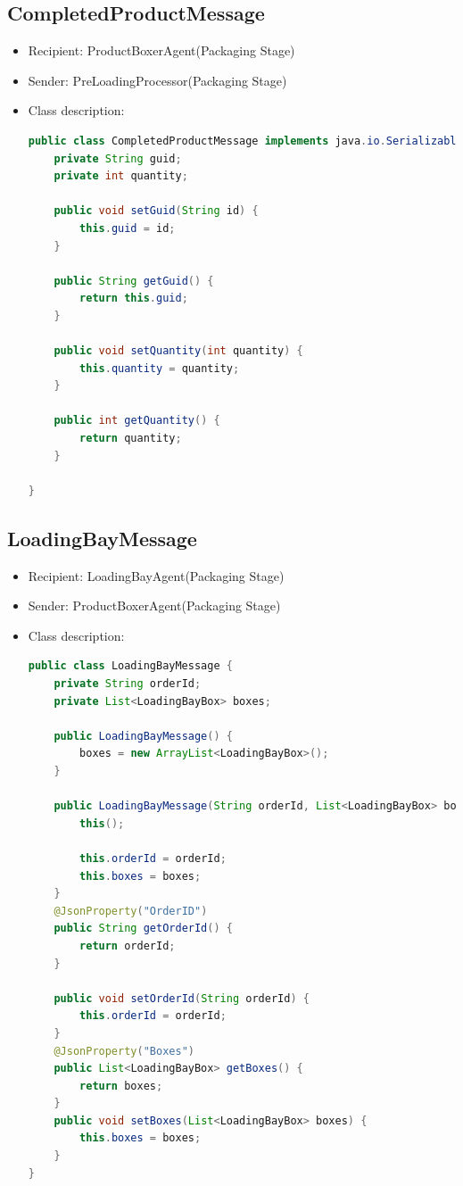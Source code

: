 \documentclass[12pt]{article}
\begin{document}
\subsection{CompletedProductMessage}
\begin{itemize}
\item Recipient: ProductBoxerAgent(Packaging Stage)
\item Sender: PreLoadingProcessor(Packaging Stage)
\item Class description:
\begin{lstlisting}[language=Java]
public class CompletedProductMessage implements java.io.Serializable {
    private String guid;
    private int quantity;
    
    public void setGuid(String id) {
        this.guid = id;
    }

    public String getGuid() {
        return this.guid;
    }

    public void setQuantity(int quantity) {
        this.quantity = quantity;
    }

    public int getQuantity() {
        return quantity;
    }

}
\end{lstlisting}
\end{itemize}
\subsection{LoadingBayMessage}
\begin{itemize}
\item Recipient: LoadingBayAgent(Packaging Stage)
\item Sender: ProductBoxerAgent(Packaging Stage)
\item Class description:
\begin{lstlisting}[language=Java]
public class LoadingBayMessage {
	private String orderId;
	private List<LoadingBayBox> boxes;
	
	public LoadingBayMessage() {
		boxes = new ArrayList<LoadingBayBox>();
	}
	
	public LoadingBayMessage(String orderId, List<LoadingBayBox> boxes) {
		this();
		
		this.orderId = orderId;
		this.boxes = boxes;
	}
	@JsonProperty("OrderID")
	public String getOrderId() {
		return orderId;
	}

	public void setOrderId(String orderId) {
		this.orderId = orderId;
	}
	@JsonProperty("Boxes")
	public List<LoadingBayBox> getBoxes() {
		return boxes;
	}
	public void setBoxes(List<LoadingBayBox> boxes) {
		this.boxes = boxes;
	}
}

\end{lstlisting}
\end{itemize}
\end{document}
